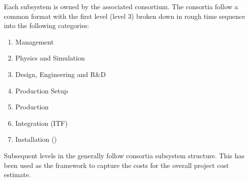 Each subsystem  is owned by the associated consortium. The
consortia  follow a common format with the first level
(level 3) broken down in rough time sequence into the following
categories:
\begin{enumerate}
  \item Management
  \item Physics and Simulation
  \item Design, Engineering and R\&D
  \item Production Setup
  \item Production
  \item Integration (ITF)
  \item Installation (\surf)
\end{enumerate}
Subsequent levels in the  generally follow consortia subsystem structure.
This  has been used as the framework to capture the costs
for the overall  project cost estimate.
